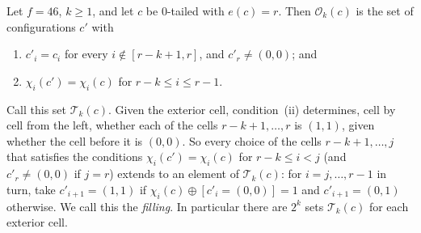 \begin{theorem}\label{cl:thm:Fk46}
Let $f=46$, $k\ge1$, and let $c$ be $0$-tailed with $e(c)=r$. Then $\mathcal O_k(c)$ is the set of configurations $c'$ with
\begin{enumerate}
\item[(i)] $c'_i=c_i$ for every $i\notin[r-k+1,r]$, and $c'_r\ne(0,0)$; and
\item[(ii)] $\chi_i(c')=\chi_i(c)$ for $r-k\le i\le r-1$.
\end{enumerate}
\end{theorem}

Call this set $\mathcal T_k(c)$. Given the exterior cell, condition~(ii) determines, cell by cell from the left, whether each of the cells $r-k+1,\dots,r$ is $(1,1)$, given whether the cell before it is $(0,0)$. So every choice of the cells $r-k+1,\dots,j$ that satisfies the conditions $\chi_i(c')=\chi_i(c)$ for $r-k\le i<j$ (and $c'_r\ne(0,0)$ if $j=r$) extends to an element of $\mathcal T_k(c)$: for $i=j,\dots,r-1$ in turn, take $c'_{i+1}=(1,1)$ if $\chi_i(c)\oplus[c'_i=(0,0)]=1$ and $c'_{i+1}=(0,1)$ otherwise. We call this the \emph{filling}. In particular there are $2^k$ sets $\mathcal T_k(c)$ for each exterior cell.

